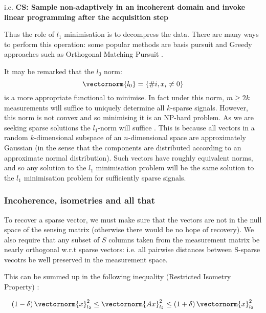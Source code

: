 i.e. \textbf{CS: Sample non-adaptively in an incoherent domain and invoke linear programming after the acquisition step}

Thus the role of \(l_{1}\) minimisation is to decompress the data. There are many ways to perform this operation: some popular methods are basis pursuit \cite{Chen1998} and Greedy approaches such as Orthogonal Matching Pursuit \cite{Tropp2007}. 

It may be remarked that the \(l_0\) norm:
%
\begin{equation}
\vectornorm{l_0} = \{\# i, x_i \neq 0\}
\end{equation}
%
is a more appropriate functional to minimise. In fact under this norm, \(m \geq 2k\) measurements will suffice to uniquely determine all \(k\)-sparse signals. However, this norm is not convex and so minimising it is an NP-hard problem. As we are seeking sparse solutions the \(l_1\)-norm will suffice \cite{Donoho2006a}. This is because all vectors in a random \(k\)-dimensional subspace of an \(n\)-dimensional space are approximately Gaussian (in the sense that the components are distributed according to an approximate normal distribution). Such vectors have roughly equivalent norms, and so any solution to the \(l_1\) minimisation problem will be the same solution to the \(l_1\) minimisation problem for sufficiently sparse signals.

\subsubsection{Incoherence, isometries and all that}
To recover a sparse vector, we must make sure that the vectors are not in the null space of the sensing matrix (otherwise there would be no hope of recovery). We also require that any subset of \(S\) columns taken from the measurement matrix be nearly orthogonal w.r.t sparse vectors: i.e. all pairwise distances between S-sparse vecotrs be well preserved in the measurement space.

This can be summed up in the following inequality (Restricted Isometry Property) \cite{Emma}:


\begin{definition}
\begin{equation}
\left(1-\delta\right)\vectornorm{x}_{l_2}^2 \leq \vectornorm{Ax}_{l_2}^2 \leq \left(1+\delta\right) \vectornorm{x}_{l_2}^2
\end{equation}
\label{RIP}
\end{definition}

